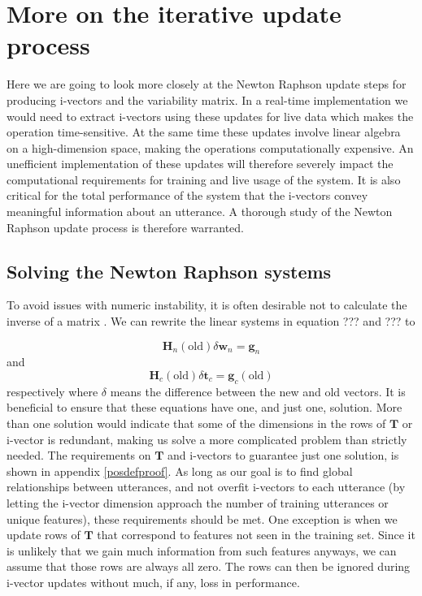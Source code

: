 \section{More on the iterative update process}

Here we are going to look more closely at the Newton Raphson update steps for producing i-vectors and the variability matrix. In a real-time implementation we would need to extract i-vectors using these updates for live data which makes the operation time-sensitive. At the same time these updates involve linear algebra on a high-dimension space, making the operations computationally expensive. An unefficient implementation of these updates will therefore severely impact the computational requirements for training and live usage of the system. It is also critical for the total performance of the system that the i-vectors convey meaningful information about an utterance. A thorough study of the Newton Raphson update process is therefore warranted. 

\subsection{Solving the Newton Raphson systems}

To avoid issues with numeric instability, it is often desirable not to calculate the inverse of a matrix \cite[p. 743]{cormen}. We can rewrite the linear systems in equation ??? and ??? to

\begin{equation}\label{lupeqN}
\mathbf{H}_n(\text{old}) \delta\mathbf{w}_n = \mathbf{g}_n
\end{equation}
and
\begin{equation}\label{lupeqC}
\mathbf{H}_c(\text{old}) \delta \mathbf{t}_c = \mathbf{g}_c(\text{old})
\end{equation}
respectively where $\delta$ means the difference between the new and old vectors. It is beneficial to ensure that these equations have one, and just one, solution. More than one solution would indicate that some of the dimensions in the rows of $\mathbf{T}$ or i-vector is redundant, making us solve a more complicated problem than strictly needed. The requirements on $\mathbf{T}$ and i-vectors to guarantee just one solution, is shown in appendix \ref{posdefproof}. As long as our goal is to find global relationships between utterances, and not overfit i-vectors to each utterance (by letting the i-vector dimension approach the number of training utterances or unique features), these requirements should be met. One exception is when we update rows of $\mathbf{T}$ that correspond to features not seen in the training set. Since it is unlikely that we gain much information from such features anyways, we can assume that those rows are always all zero. The rows can then be ignored during i-vector updates without much, if any, loss in performance.

